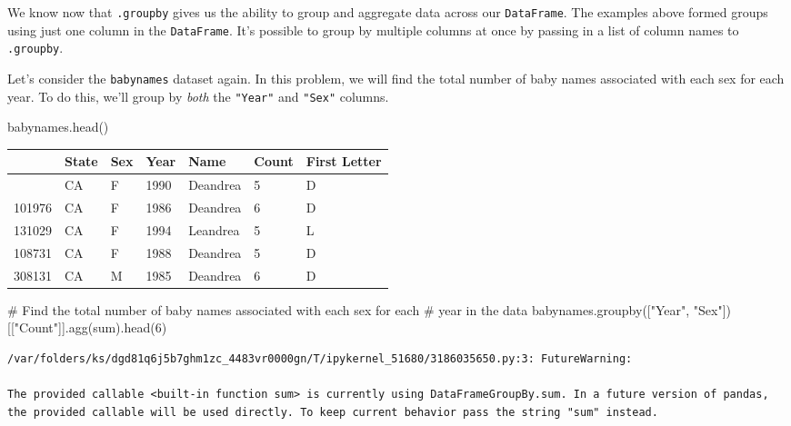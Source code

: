 \documentclass[
  letterpaper,
  DIV=11,
  numbers=noendperiod]{scrreprt}
\newenvironment{Shaded}{\begin{snugshade}}{\end{snugshade}}
\newcommand{\BuiltInTok}[1]{\textcolor[rgb]{0.00,0.23,0.31}{#1}}
\newcommand{\CommentTok}[1]{\textcolor[rgb]{0.37,0.37,0.37}{#1}}
\newcommand{\DecValTok}[1]{\textcolor[rgb]{0.68,0.00,0.00}{#1}}
\newcommand{\NormalTok}[1]{\textcolor[rgb]{0.00,0.23,0.31}{#1}}
\newcommand{\StringTok}[1]{\textcolor[rgb]{0.13,0.47,0.30}{#1}}
\begin{document}
We know now that \texttt{.groupby} gives us the ability to group and
aggregate data across our \texttt{DataFrame}. The examples above formed
groups using just one column in the \texttt{DataFrame}. It's possible to
group by multiple columns at once by passing in a list of column names
to \texttt{.groupby}.

Let's consider the \texttt{babynames} dataset again. In this problem, we
will find the total number of baby names associated with each sex for
each year. To do this, we'll group by \emph{both} the \texttt{"Year"}
and \texttt{"Sex"} columns.

\begin{Shaded}
\begin{Highlighting}[]
\NormalTok{babynames.head()}
\end{Highlighting}
\end{Shaded}

\begin{longtable}[]{@{}lllllll@{}}
\toprule\noalign{}
& State & Sex & Year & Name & Count & First Letter \\
\midrule\noalign{}
\endhead
\bottomrule\noalign{}
\endlastfoot
115957 & CA & F & 1990 & Deandrea & 5 & D \\
101976 & CA & F & 1986 & Deandrea & 6 & D \\
131029 & CA & F & 1994 & Leandrea & 5 & L \\
108731 & CA & F & 1988 & Deandrea & 5 & D \\
308131 & CA & M & 1985 & Deandrea & 6 & D \\
\end{longtable}

\begin{Shaded}
\begin{Highlighting}[]
\CommentTok{\# Find the total number of baby names associated with each sex for each }
\CommentTok{\# year in the data}
\NormalTok{babynames.groupby([}\StringTok{"Year"}\NormalTok{, }\StringTok{"Sex"}\NormalTok{])[[}\StringTok{"Count"}\NormalTok{]].agg(}\BuiltInTok{sum}\NormalTok{).head(}\DecValTok{6}\NormalTok{)}
\end{Highlighting}
\end{Shaded}

\begin{verbatim}
/var/folders/ks/dgd81q6j5b7ghm1zc_4483vr0000gn/T/ipykernel_51680/3186035650.py:3: FutureWarning:

The provided callable <built-in function sum> is currently using DataFrameGroupBy.sum. In a future version of pandas, the provided callable will be used directly. To keep current behavior pass the string "sum" instead.
\end{verbatim}
\end{document}
